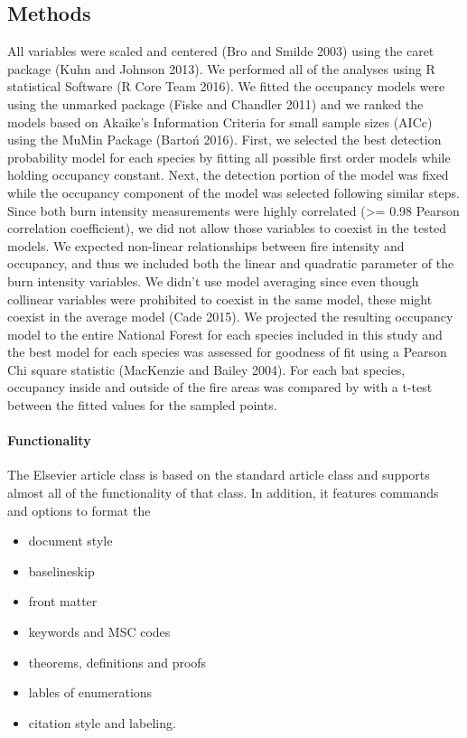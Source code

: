 \documentclass[]{elsarticle} %
\begin{document}
\subsection{Methods}\label{methods}

All variables were scaled and centered (Bro and Smilde 2003) using the
caret package (Kuhn and Johnson 2013). We performed all of the analyses
using R statistical Software (R Core Team 2016). We fitted the occupancy
models were using the unmarked package (Fiske and Chandler 2011) and we
ranked the models based on Akaike's Information Criteria for small
sample sizes (AICc) using the MuMin Package (Bartoń 2016). First, we
selected the best detection probability model for each species by
fitting all possible first order models while holding occupancy
constant. Next, the detection portion of the model was fixed while the
occupancy component of the model was selected following similar steps.
Since both burn intensity measurements were highly correlated
(\textgreater{}= 0.98 Pearson correlation coefficient), we did not allow
those variables to coexist in the tested models. We expected non-linear
relationships between fire intensity and occupancy, and thus we included
both the linear and quadratic parameter of the burn intensity variables.
We didn't use model averaging since even though collinear variables were
prohibited to coexist in the same model, these might coexist in the
average model (Cade 2015). We projected the resulting occupancy model to
the entire National Forest for each species included in this study and
the best model for each species was assessed for goodness of fit using a
Pearson Chi square statistic (MacKenzie and Bailey 2004). For each bat
species, occupancy inside and outside of the fire areas was compared by
with a t-test between the fitted values for the sampled points.

\paragraph{Functionality}\label{functionality}

The Elsevier article class is based on the standard article class and
supports almost all of the functionality of that class. In addition, it
features commands and options to format the

\begin{itemize}
\item
  document style
\item
  baselineskip
\item
  front matter
\item
  keywords and MSC codes
\item
  theorems, definitions and proofs
\item
  lables of enumerations
\item
  citation style and labeling.
\end{itemize}
\end{document}
